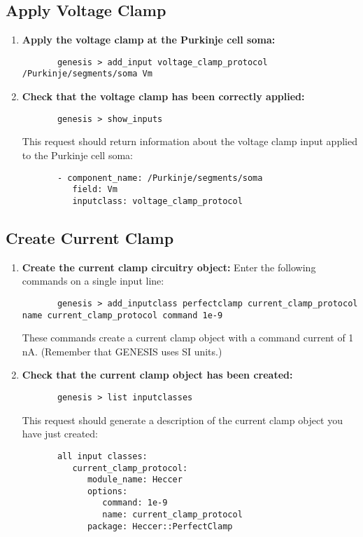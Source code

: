 \documentclass[12pt]{article}
\begin{document}
\subsection{Apply Voltage Clamp}

\begin{enumerate}
	\item{\bf Apply the voltage clamp at the Purkinje cell soma:}
	\begin{verbatim}
	   genesis > add_input voltage_clamp_protocol /Purkinje/segments/soma Vm
	\end{verbatim}
	
	\item{\bf Check that the voltage clamp has been correctly applied:}
	\begin{verbatim}
	   genesis > show_inputs
	\end{verbatim}
	This request should return information about the voltage clamp input applied to the Purkinje cell soma:
	\begin{verbatim}
	   - component_name: /Purkinje/segments/soma
	      field: Vm
	      inputclass: voltage_clamp_protocol
	   \end{verbatim}
\end{enumerate}

\subsection*{Create Current Clamp}

\begin{enumerate}
	\item{\bf Create the current clamp circuitry object:} Enter the following commands on a single input line:
	\begin{verbatim}
	   genesis > add_inputclass perfectclamp current_clamp_protocol name current_clamp_protocol command 1e-9
	\end{verbatim}
	These commands create a current clamp object with a command current of 1\,nA. (Remember that GENESIS uses SI units.)
	
	\item{\bf Check that the current clamp object has been created:}
	\begin{verbatim}
	   genesis > list inputclasses
	\end{verbatim}
	This request should generate a description of the current clamp object you have just created:
	\begin{verbatim}
	   all input classes: 
	      current_clamp_protocol:
	         module_name: Heccer
	         options:
	            command: 1e-9
	            name: current_clamp_protocol
	         package: Heccer::PerfectClamp
	\end{verbatim}
\end{enumerate}
\end{document}
